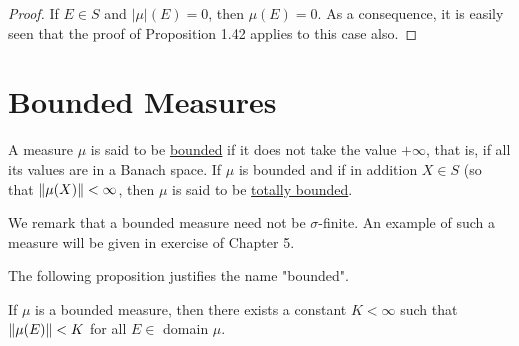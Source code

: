 \begin{proof}
If $E \in S$ and $|\mu|(E)=0$, then $\mu(E)=0$. As a consequence, it is easily seen that the proof of Proposition 1.42 applies to this case also.
\end{proof}

\section{Bounded Measures}
\begin{definition}
A measure $\mu$ is said to be \underline{bounded} if it does not take the value $+\infty$, that is, if all its values are in a Banach space. If $\mu$ is bounded and if in addition $X\in S$ (so that $\norm{\mu(X)}<\infty$, then $\mu$ is said to be \underline{totally bounded}.
\end{definition}

We remark that a bounded measure need not be $\sigma$-finite. An example of such a measure will be given in exercise of Chapter 5.

The following proposition justifies the name "bounded".

\begin{proposition}
If $\mu$ is a bounded measure, then there exists a constant $K<\infty$ such that $\norm{\mu(E)}<K$ for all $E \in$ domain $\mu$.
\end{proposition}

